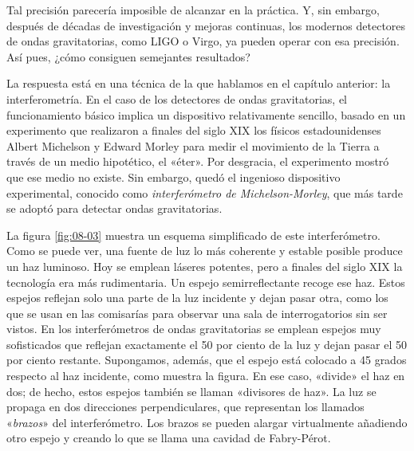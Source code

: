 Tal precisión parecería imposible de alcanzar en la práctica. Y, sin embargo, después de décadas de investigación y mejoras continuas, los modernos detectores de ondas gravitatorias, como LIGO o Virgo, ya pueden operar con esa precisión. Así pues, ¿cómo consiguen semejantes resultados?

La respuesta está en una técnica de la que hablamos en el capítulo anterior: la interferometría. En el caso de los detectores de ondas gravitatorias, el funcionamiento básico implica un dispositivo relativamente sencillo, basado en un experimento que realizaron a finales del siglo XIX los físicos estadounidenses Albert Michelson y Edward Morley para medir el movimiento de la Tierra a través de un medio hipotético, el «éter». Por desgracia, el experimento mostró que ese medio no existe. Sin embargo, quedó el ingenioso dispositivo experimental, conocido como \emph{interferómetro de Michelson-Morley}, que más tarde se adoptó para detectar ondas gravitatorias.

La figura \ref{fig:08-03} muestra un esquema simplificado de este interferómetro. Como se puede ver, una fuente de luz lo más coherente y estable posible produce un haz luminoso. Hoy se emplean láseres potentes, pero a finales del siglo XIX la tecnología era más rudimentaria. Un espejo semirreflectante recoge ese haz. Estos espejos reflejan solo una parte de la luz incidente y dejan pasar otra, como los que se usan en las comisarías para observar una sala de interrogatorios sin ser vistos. En los interferómetros de ondas gravitatorias se emplean espejos muy sofisticados que reflejan exactamente el 50 por ciento de la luz y dejan pasar el 50 por ciento restante. Supongamos, además, que el espejo está colocado a 45 grados respecto al haz incidente, como muestra la figura. En ese caso, «divide» el haz en dos; de hecho, estos espejos también se llaman «divisores de haz». La luz se propaga en dos direcciones perpendiculares, que representan los llamados «\emph{brazos}» del interferómetro. Los brazos se pueden alargar virtualmente añadiendo otro espejo y creando lo que se llama una cavidad de Fabry-Pérot.

